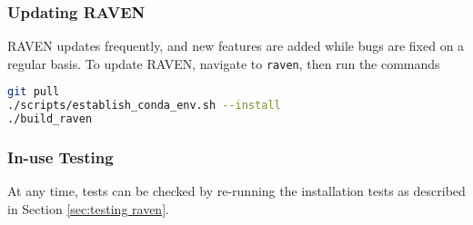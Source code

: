 \subsubsection{Updating RAVEN}
RAVEN updates frequently, and new features are added while bugs are fixed on a regular basis.  To update
RAVEN, navigate to \texttt{raven}, then run the commands
\begin{lstlisting}[language=bash]
git pull
./scripts/establish_conda_env.sh --install
./build_raven
\end{lstlisting}


\subsubsection{In-use Testing}

At any time, tests can be checked by re-running the installation tests as
described in Section \ref{sec:testing raven}.
